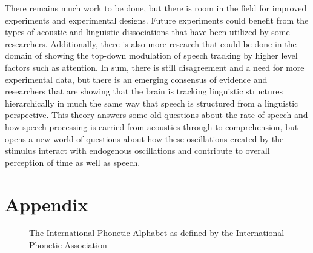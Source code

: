 \documentclass[titlepage]{article}
\begin{document}
    There remains much work to be done, but there is room in the field 
    for improved experiments and experimental designs. Future experiments could benefit from the types of 
    acoustic and linguistic dissociations that have been utilized by some 
    researchers. Additionally, there is also more research that could be done in the 
    domain of showing the top-down modulation of speech tracking by higher level
    factors such as attention. In sum, there is still disagreement and a need for 
    more experimental data, but there is an emerging consensus of evidence and 
    researchers that are showing that the brain is tracking linguistic 
    structures hierarchically in much the same way that speech is structured 
    from a linguistic perspective. This theory answers some old questions about 
    the rate of speech and how speech processing is carried from acoustics 
    through to comprehension, but opens a new world of questions about how 
    these oscillations created by the stimulus interact with endogenous oscillations 
    and contribute to overall perception of time as well as speech.

\appendix
\section{Appendix}

\renewcommand\thefigure{\thesection.\arabic{figure}}    
\setcounter{figure}{0}

  \begin{figure}
    \caption{The International Phonetic Alphabet as defined by the International
    Phonetic Association}
    \label{ipaChart}
  \end{figure}

\newpage
\printbibliography
\end{document}
